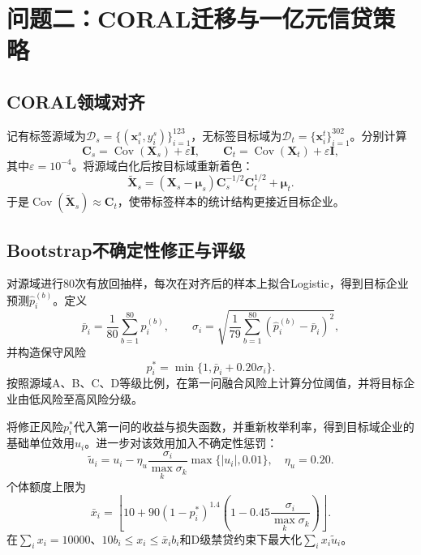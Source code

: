 \documentclass[UTF8,a4paper,12pt,fontset=fandol]{ctexart}
\numberwithin{equation}{section}
\begin{document}
\section{问题二：CORAL迁移与一亿元信贷策略}

\subsection{CORAL领域对齐}

记有标签源域为$\mathcal D_s=\{(\bm x_i^s,y_i^s)\}_{i=1}^{123}$，无标签目标域为$\mathcal D_t=\{\bm x_i^t\}_{i=1}^{302}$。分别计算
\begin{equation}
\bm C_s=\operatorname{Cov}(\bm X_s)+\varepsilon\bm I,\qquad
\bm C_t=\operatorname{Cov}(\bm X_t)+\varepsilon\bm I,
\end{equation}
其中$\varepsilon=10^{-4}$。将源域白化后按目标域重新着色：
\begin{equation}
\widetilde{\bm X}_s=(\bm X_s-\bm\mu_s)\bm C_s^{-1/2}\bm C_t^{1/2}+\bm\mu_t.
\end{equation}
于是$\operatorname{Cov}(\widetilde{\bm X}_s)\approx\bm C_t$，使带标签样本的统计结构更接近目标企业。

\subsection{Bootstrap不确定性修正与评级}

对源域进行80次有放回抽样，每次在对齐后的样本上拟合Logistic，得到目标企业预测$\hat p_i^{(b)}$。定义
\begin{equation}
\bar p_i=\frac1{80}\sum_{b=1}^{80}\hat p_i^{(b)},\qquad
\sigma_i=\sqrt{\frac1{79}\sum_{b=1}^{80}(\hat p_i^{(b)}-\bar p_i)^2},
\end{equation}
并构造保守风险
\begin{equation}
p_i^*=\min\{1,\bar p_i+0.20\sigma_i\}.
\end{equation}
按照源域A、B、C、D等级比例，在第一问融合风险上计算分位阈值，并将目标企业由低风险至高风险分级。

将修正风险$p_i^*$代入第一问的收益与损失函数，并重新枚举利率，得到目标域企业的基础单位效用$u_i$。进一步对该效用加入不确定性惩罚：
\begin{equation}
\widetilde u_i=u_i-\eta_u\frac{\sigma_i}{\max_k\sigma_k}\max\{|u_i|,0.01\},\quad \eta_u=0.20.
\end{equation}
个体额度上限为
\begin{equation}
\bar x_i=\left\lfloor10+90(1-p_i^*)^{1.4}
\left(1-0.45\frac{\sigma_i}{\max_k\sigma_k}\right)\right\rfloor.
\end{equation}
在$\sum_i x_i=10000$、$10b_i\le x_i\le\bar x_ib_i$和D级禁贷约束下最大化$\sum_i x_i\widetilde u_i$。
\end{document}
